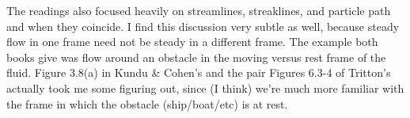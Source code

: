 \documentclass[11pt]{article}
\begin{document}
The readings also focused heavily on streamlines, streaklines, and particle path and when they coincide. I find this discussion very subtle as well, because steady flow in one frame need not be steady in a different frame. The example both books give was flow around an obstacle in the moving versus rest frame of the fluid. Figure 3.8(a) in Kundu \& Cohen's and the pair Figures 6.3-4 of Tritton's actually took me some figuring out, since (I think) we're much more familiar with the frame in which the obstacle (ship/boat/etc) is at rest. 


  
\end{document}
